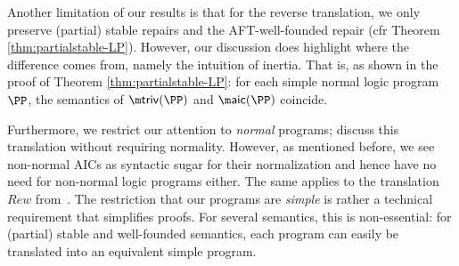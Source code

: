 Another limitation of our results is that for the reverse translation, we only preserve (partial) stable repairs and the AFT-well-founded repair (cfr Theorem \ref{thm:partialstable-LP}). 
However, our discussion does highlight where the difference comes from, namely the intuition of inertia. 
That is, as shown in the proof of Theorem \ref{thm:partialstable-LP}: for each simple normal logic program $\PP$, the semantics of $\triv(\PP)$ and $\aicop(\PP)$ coincide. 

Furthermore, we restrict our attention to \emph{normal} programs; \citet{tplp/CaropreseT11} discuss this translation without requiring normality. However, as mentioned before, we see non-normal AICs as syntactic sugar for their normalization and hence have no need for non-normal logic programs either. The same applies to the translation $\mathit{Rew}$ from~\cite{iclp/CaropreseGSZ06}.
The restriction that our programs are \emph{simple} is rather a technical requirement that simplifies proofs. For several semantics, this is non-essential: for (partial) stable and well-founded semantics, each program can easily be translated into an equivalent simple program.  


